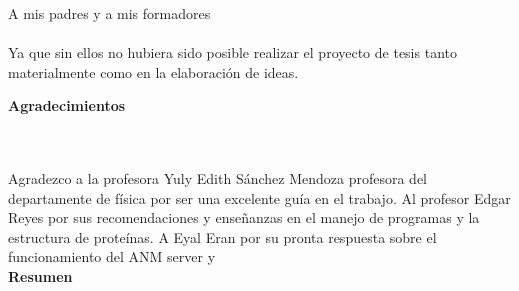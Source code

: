 \newpage
\thispagestyle{empty} \textbf{}\normalsize
\\\\\\%

\begin{flushright}
\begin{minipage}{8cm}
    \noindent
        \small
        A mis padres y a mis formadores\\[1.0cm]\\
		Ya que sin ellos no hubiera sido posible realizar el proyecto de tesis tanto materialmente como en la elaboraci\'{o}n de ideas.\\
\end{minipage}
\end{flushright}


\newpage
\textbf{\LARGE Agradecimientos}
\\\\
Agradezco a la profesora Yuly Edith S\'{a}nchez Mendoza profesora del departamente de f\'{i}sica por ser una excelente gu\'{i}a en el trabajo. Al profesor Edgar Reyes por sus recomendaciones y ense\~{n}anzas en el manejo de programas y la estructura de prote\'{i}nas. A Eyal Eran por su pronta respuesta sobre el funcionamiento del ANM server y \\


\newpage
\textbf{\LARGE Resumen}
\\\\

